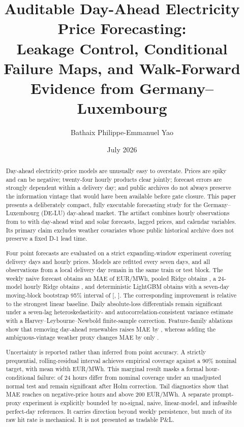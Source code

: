 \documentclass[11pt]{article}
\title{Auditable Day-Ahead Electricity Price Forecasting:\\
Leakage Control, Conditional Failure Maps, and Walk-Forward Evidence from
Germany--Luxembourg}
\author{Bathaix Philippe-Emmanuel Yao}
\date{July 2026}
\begin{document}
\maketitle

\begin{abstract}
Day-ahead electricity-price models are unusually easy to overstate.  Prices
are spiky and can be negative; twenty-four hourly products clear jointly;
forecast errors are strongly dependent within a delivery day; and public
archives do not always preserve the information vintage that would have been
available before gate closure.  This paper presents a deliberately compact,
fully executable forecasting study for the Germany--Luxembourg (DE-LU)
day-ahead market.  The artifact combines \DataRows{} hourly observations from
\DataStart{} to \DataEnd{} with day-ahead wind and solar forecasts, lagged
prices, and calendar variables.  Its primary claim excludes weather covariates
whose public historical archive does not preserve a fixed D-1 lead time.

Four point forecasts are evaluated on a strict expanding-window experiment
covering \OOSDays{} delivery days and \OOSObservations{} hourly prices.  Models
are refitted every seven days, and all observations from a local delivery day
remain in the same train or test block.  The weekly naive forecast obtains an
MAE of \NaiveMAE{} EUR/MWh, pooled Ridge obtains \RidgeMAE{}, a 24-model
hourly Ridge obtains \HourlyRidgeMAE{}, and deterministic LightGBM obtains
\PrimaryMAE{} with a seven-day moving-block bootstrap 95\%
interval of [\PrimaryMAELow{}, \PrimaryMAEHigh{}].  The corresponding
improvement is \SkillHourlyRidge{} relative to the strongest linear baseline.
Daily absolute-loss differentials remain significant under a seven-lag
heteroskedasticity- and autocorrelation-consistent variance estimate with a
Harvey--Leybourne--Newbold finite-sample correction. Feature-family ablations
show that removing day-ahead renewables
raises MAE by \NoRenewablesDelta{}, whereas adding the ambiguous-vintage
weather proxy changes MAE by only \WeatherDelta{}.

Uncertainty is reported rather than inferred from point accuracy.  A
strictly prequential, rolling-residual interval achieves
\ConformalCoverage{} empirical coverage against a 90\% nominal target, with
mean width \ConformalWidth{} EUR/MWh.  This marginal result masks a formal
hour-conditional failure: \ConditionalSignificantHours{} of 24 hours differ
from nominal coverage under an unadjusted normal test and
\ConditionalHolmHours{} remain significant after Holm correction. Tail
diagnostics show that MAE reaches \NegativeMAE{} on negative-price hours and
\HighMAE{} above 200 EUR/MWh. A separate prompt-proxy experiment is explicitly
bounded by no-signal, naive, linear-model, and infeasible perfect-day
references. It carries direction beyond weekly persistence, but much of its
raw \SignalHit{} hit rate is mechanical. It is not presented as tradable P\&L.


\end{abstract}
\end{document}
